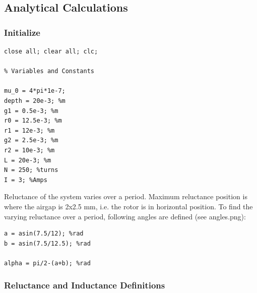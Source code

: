     
\subsection*{Analytical Calculations}



\subsubsection*{Initialize}

\begin{verbatim}
close all; clear all; clc;

% Variables and Constants

mu_0 = 4*pi*1e-7;
depth = 20e-3; %m
g1 = 0.5e-3; %m
r0 = 12.5e-3; %m
r1 = 12e-3; %m
g2 = 2.5e-3; %m
r2 = 10e-3; %m
L = 20e-3; %m
N = 250; %turns
I = 3; %Amps
\end{verbatim}
\begin{par}
Reluctance of the system varies over a period. Maximum reluctance position is where the airgap is 2x2.5 mm, i.e. the rotor is in horizontal position. To find the varying reluctance over a period, following angles are defined (see angles.png):
\end{par} \vspace{1em}
\begin{verbatim}
a = asin(7.5/12); %rad
b = asin(7.5/12.5); %rad

alpha = pi/2-(a+b); %rad
\end{verbatim}


\subsubsection*{Reluctance and Inductance Definitions}

